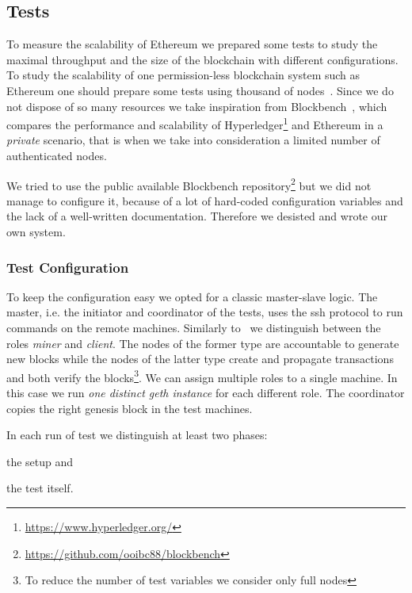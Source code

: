 \subsection{Tests}

To measure the scalability of Ethereum we prepared some tests to study
the maximal throughput and the size of the blockchain with different
configurations.
To study the scalability of one permission-less blockchain system such as
Ethereum one should prepare some tests using thousand of
nodes~\cite{bib:securityAndScalabilityPoW, bib:algorand}.
Since we do not dispose of so many resources we take inspiration from
Blockbench~\cite{blockbench}, which compares the performance and scalability
of Hyperledger\footnote{\url{https://www.hyperledger.org/}} and Ethereum in a
\emph{private} scenario, that is when
we take into consideration a limited number of authenticated nodes.

We tried to use the public available Blockbench
repository\footnote{\url{https://github.com/ooibc88/blockbench}}
but we did not manage to configure it, because of a lot of hard-coded
configuration variables and the lack of a well-written documentation.
Therefore we desisted and wrote our own system.


\subsubsection{Test Configuration}

To keep the configuration easy we opted for a classic master-slave logic.
The master, i.e. the initiator and coordinator of the tests, uses the ssh
protocol to run commands on the remote machines.
Similarly to~\cite{blockbench} we distinguish between the roles \emph{miner} and
\emph{client}. The nodes of the former type are accountable to generate new
blocks while the nodes of the latter type create and propagate transactions and
both verify the blocks\footnote{To reduce the number of test variables we
consider only full nodes}.
We can assign multiple roles to a single machine. In this case we run
\emph{one distinct geth instance} for each different role.
The coordinator copies the right genesis block in the test machines.



In each run of test we distinguish at least two phases:
\begin{enumerate*}
    \item the setup and
    \item the test itself.
\end{enumerate*}



